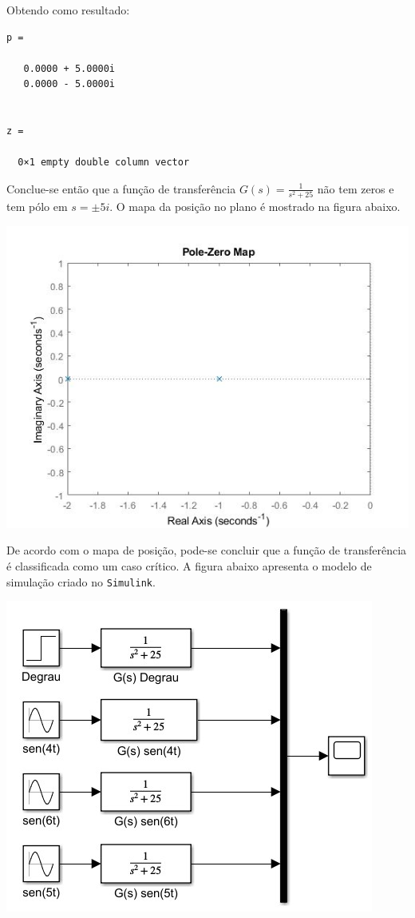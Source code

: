 \documentclass[
]{book}
\theoremstyle{definition}
\theoremstyle{definition}
\theoremstyle{definition}
\theoremstyle{remark}
\begin{document}
Obtendo como resultado:

\begin{verbatim}
p =

   0.0000 + 5.0000i
   0.0000 - 5.0000i


z =

  0×1 empty double column vector
\end{verbatim}

Conclue-se então que a função de transferência \(G(s) = \frac {1}{s^2 +25}\) não tem zeros e tem pólo em \(s = \pm 5i\). O mapa da posição no plano é mostrado na figura abaixo.

\includegraphics{Imagens/Lab2/prob3.jpg}

De acordo com o mapa de posição, pode-se concluir que a função de transferência é classificada como um caso crítico. A figura abaixo apresenta o modelo de simulação criado no \texttt{Simulink}.

\includegraphics{Imagens/Lab2/modelSim3.jpg}
\end{document}
